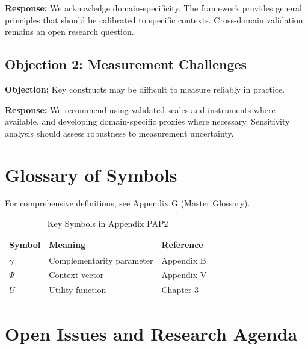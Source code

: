 \textbf{Response:} We acknowledge domain-specificity. The framework provides
general principles that should be calibrated to specific contexts. Cross-domain
validation remains an open research question.

\subsection{Objection 2: Measurement Challenges}

\textbf{Objection:} Key constructs may be difficult to measure reliably in
practice.

\textbf{Response:} We recommend using validated scales and instruments where
available, and developing domain-specific proxies where necessary. Sensitivity
analysis should assess robustness to measurement uncertainty.



\section{Glossary of Symbols}
\label{sec:pap2-glossary}

For comprehensive definitions, see Appendix G (Master Glossary).

\begin{table}[htbp]
\centering
\caption{Key Symbols in Appendix PAP2}
\begin{tabular}{lll}
\toprule
\textbf{Symbol} & \textbf{Meaning} & \textbf{Reference} \\
\midrule
$\gamma$ & Complementarity parameter & Appendix B \\
$\Psi$ & Context vector & Appendix V \\
$U$ & Utility function & Chapter 3 \\
\bottomrule
\end{tabular}
\end{table}



\section{Open Issues and Research Agenda}
\label{sec:x-open}

